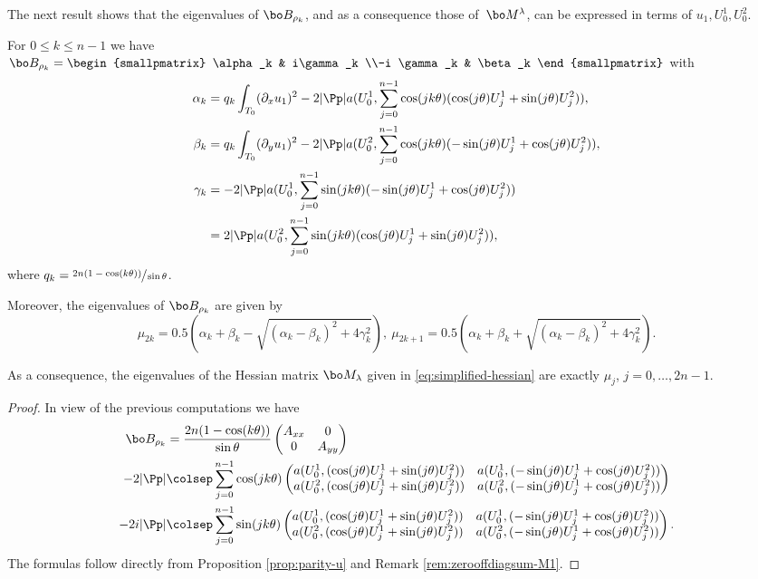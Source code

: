 The next result shows that the eigenvalues of $\bo B_{\rho_k}$, and as a consequence those of~$\bo M^\lambda$, can be expressed in terms of $u_1,U_0^1,U_0^2$.
\begin{thm}
For $0\leq k \leq n-1$ we have $\bo B_{\rho_k} = \begin{smallpmatrix}
\alpha_k & i\gamma_k \\-i \gamma_k & \beta_k
\end{smallpmatrix}$
with
\begin{align*}
\alpha_k & = q_k\int_{T_0}(\partial_x u_1)^2-2|\Pp| a(U_0^1,\sum_{j=0}^{n-1} \cos(jk\theta)(\cos (j\theta) U_j^1+\sin (j\theta) U_j^2)), \\
\beta_k & = q_k\int_{T_0} (\partial_y u_1)^2 -2|\Pp| a(U_0^2,\sum_{j=0}^{n-1} \cos(jk\theta)(-\sin (j\theta) U_j^1+\cos (j\theta) U_j^2)),\\
\gamma_k & = -2|\Pp|a(U_0^1,\sum_{j=0}^{n-1} \sin(jk\theta)(-\sin (j\theta) U_j^1+\cos (j\theta) U_j^2))\\ & = 2|\Pp|a(U_0^2,\sum_{j=0}^{n-1} \sin(jk\theta)(\cos (j\theta) U_j^1+\sin (j\theta) U_j^2)),
\end{align*}
where $q_k=\sfrac{2n(1-\cos(k\theta))}{\sin \theta}$.

Moreover, the eigenvalues of $\bo B_{\rho_k}$ are given by
\[
\mu_{2k} = 0.5(\alpha_k+\beta_k- \sqrt{(\alpha_k-\beta_k)^2+4\gamma_k^2}), \ \mu_{2k+1} = 0.5(\alpha_k+\beta_k+ \sqrt{(\alpha_k-\beta_k)^2+4\gamma_k^2}).
\]

As a consequence, the eigenvalues of the Hessian matrix $\bo M_\lambda$ given in \eqref{eq:simplified-hessian} are exactly $\mu_j$, $j=0,\dots,2n-1$.
\label{thm:explicit-eigenvalues}
\end{thm}

\begin{proof} In view of the previous computations we have
{\small \begin{align*}
\bo B_{\rho_k} & = \frac{2n(1-\cos (k\theta))}{\sin \theta} \begin{pmatrix}
A_{xx}& 0 \\
0 & A_{yy}
\end{pmatrix} \\
-2|\Pp| &\colsep\sum_{j=0}^{n-1}\cos(jk\theta)\begin{pmatrix}
a(U_0^1, (\cos (j\theta) U_j^1+\sin (j\theta) U_j^2)) & a(U_0^1, (-\sin (j\theta) U_j^1+\cos (j\theta) U_j^2)) \\
a(U_0^2, (\cos (j\theta) U_j^1+\sin (j\theta) U_j^2)) &
a(U_0^2, (-\sin (j\theta) U_j^1+\cos (j\theta) U_j^2))
\end{pmatrix}\\
-2i|\Pp| & \colsep\sum_{j=0}^{n-1} \sin(jk\theta)\begin{pmatrix}
a(U_0^1,(\cos (j\theta) U_j^1+\sin (j\theta) U_j^2)) & a(U_0^1,(-\sin (j\theta) U_j^1+\cos (j\theta) U_j^2)) \\
a(U_0^2,(\cos (j\theta) U_j^1+\sin (j\theta) U_j^2)) &
a(U_0^2,(-\sin (j\theta) U_j^1+\cos (j\theta) U_j^2))
\end{pmatrix}.
\end{align*}
}
The formulas follow directly from Proposition \ref{prop:parity-u} and Remark \ref{rem:zerooffdiagsum-M1}.
\end{proof}

